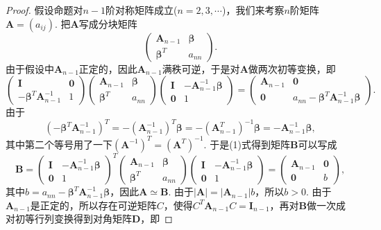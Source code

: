 \documentclass{article}
\newcommand{\mbf}[1]{\bm{#1}}
\begin{document}
\begin{proof}
假设命题对$n-1$阶对称矩阵成立($n=2,3,\cdots$)，我们来考察$n$阶矩阵$\mbf{A}=(a_{ij})$. 把$\mbf{A}$写成分块矩阵
$$
\begin{pmatrix}
\mbf{A}_{n-1} & \mbf{\beta} \\
\mbf{\beta}^T & a_{nn} 
\end{pmatrix}.
$$
由于假设中$\mbf{A}_{n-1}$正定的，因此$\mbf{A}_{n-1}$满秩可逆，于是对$\mbf{A}$做两次初等变换，即
\begin{equation}
\begin{pmatrix}
\mbf{I} & \mbf{0} \\
-\mbf{\beta}^{T}\mbf{A}_{n-1}^{-1} & 1
\end{pmatrix}
\begin{pmatrix}
\mbf{A}_{n-1} & \mbf{\beta} \\
\mbf{\beta}^T & a_{nn} 
\end{pmatrix}
\begin{pmatrix}
\mbf{I} & -\mbf{A}_{n-1}^{-1}\mbf{\beta} \\
\mbf{0} & 1 
\end{pmatrix} = 
\begin{pmatrix}
\mbf{A}_{n-1} & \mbf{0} \\
\mbf{0} & a_{nn} -\mbf{\beta}^{T}\mbf{A}_{n-1}^{-1}\mbf{\beta}
\end{pmatrix}.
\end{equation}
由于
$$
(-\mbf{\beta}^{T}\mbf{A}_{n-1}^{-1})^T =  -(\mbf{A}_{n-1}^{-1})^T\mbf{\beta} = -(\mbf{A}_{n-1}^T)^{-1}\mbf{\beta} = -\mbf{A}_{n-1}^{-1}\mbf{\beta}, 
$$
其中第二个等号用了一下$(\mbf{A}^{-1})^T = (\mbf{A}^{T})^{-1}$. 于是(1)式得到矩阵$\mbf{B}$可以写成
$$
\mbf{B} = 
\begin{pmatrix}
\mbf{I} & -\mbf{A}_{n-1}^{-1}\mbf{\beta} \\
\mbf{0} & 1 
\end{pmatrix}^T
\begin{pmatrix}
\mbf{A}_{n-1} & \mbf{\beta} \\
\mbf{\beta}^T & a_{nn} 
\end{pmatrix}
\begin{pmatrix}
\mbf{I} & -\mbf{A}_{n-1}^{-1}\mbf{\beta} \\
\mbf{0} & 1 
\end{pmatrix} = 
\begin{pmatrix}
\mbf{A}_{n-1} & \mbf{0} \\
\mbf{0} & b
\end{pmatrix},
$$
其中$b=a_{nn} -\mbf{\beta}^{T}\mbf{A}_{n-1}^{-1}\mbf{\beta}$，因此$\mbf{A} \simeq \mbf{B}$. 由于$|\mbf{A}| = |\mbf{A}_{n-1}|b$，所以$b >0$. 由于$\mbf{A}_{n-1}$是正定的，所以存在可逆矩阵$C$，使得$C^T\mbf{A}_{n-1}C = \mbf{I}_{n-1}$，再对$\mbf{B}$做一次成对初等行列变换得到对角矩阵$\mbf{D}$，即

\end{proof}
\end{document}
